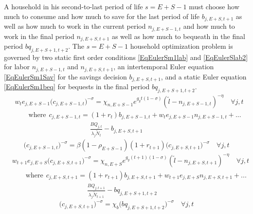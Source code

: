 \documentclass[letterpaper,12pt]{article}
\theoremstyle{definition}
\begin{document}
\begin{spacing}{1.5}
    A household in his second-to-last period of life $s=E+S-1$ must choose how much to consume and how much to save for the last period of life $b_{j,E+S,t+1}$ as well as how much to work in the current period $n_{j,E+S-1,t}$ and how much to work in the final period $n_{j,E+S,t+1}$ as well as how much to bequeath in the final period $bq_{j,E+S+1,t+2}$. The $s=E+S-1$ household optimization problem is governed by two static first order conditions \eqref{EqEulerSm1lab} and \eqref{EqEulerSlab2} for labor  $n_{j,E+S-1,t}$ and $n_{j,E+S,t+1}$, an intertemporal Euler equation \eqref{EqEulerSm1Sav} for the savings decision $b_{j,E+S,t+1}$, and a static Euler equation \eqref{EqEulerSm1beq} for bequests in the final period $bq_{j,E+S+1,t+2}$.
    \begin{equation}\label{EqEulerSm1lab}
      \begin{split}
        &w_t e_{j,E+S-1}\bigl(c_{j,E+S-1,t}\bigr)^{-\sigma} = \chi_{n,E+S-1}e^{g_y t(1-\sigma)}(\tilde{l} - n_{j,E+S-1,t})^{-\eta} \quad\forall j,t \\
        &\quad\quad\text{where}\:\: c_{j,E+S-1,t} = \left(1+r_t\right)b_{j,E+S-1,t} + w_t e_{j,E+S-1}n_{j,E+S-1,t} + ... \\
        &\quad\quad\quad\quad\quad\quad\quad\quad\quad\quad\quad \frac{BQ_{j,t}}{\lambda_j\tilde{N}_t} - b_{j,E+S,t+1}
      \end{split}
    \end{equation}
    \begin{equation}\label{EqEulerSm1Sav}
      \bigl(c_{j,E+S-1,t}\bigr)^{-\sigma} = \beta(1-\rho_{E+S-1})(1+r_{t+1})\bigl(c_{j,E+S,t+1}\bigr)^{-\sigma} \quad\forall j,t
    \end{equation}
    \begin{equation}\label{EqEulerSlab2}
      \begin{split}
        &w_{t+1}e_{j,E+S}\bigl(c_{j,E+S,t+1}\bigr)^{-\sigma} = \chi_{n,E+S}e^{g_y(t+1)(1-\sigma)}(\tilde{l} - n_{j,E+S,t+1})^{-\eta} \quad\forall j,t \\
        &\quad\quad\text{where}\:\: c_{j,E+S,t+1} = \left(1+r_{t+1}\right)b_{j,E+S,t+1} + w_{t+1} e_{j,E+S}n_{j,E+S,t+1} + ... \\
        &\quad\quad\quad\quad\quad\quad\quad\quad\quad\quad\quad \frac{BQ_{j,t+1}}{\lambda_j\tilde{N}_{t+1}} - bq_{j,E+S+1,t+2}
      \end{split}
    \end{equation}
    \begin{equation}\label{EqEulerSm1beq}
      \bigl(c_{j,E+S,t+1}\bigr)^{-\sigma} = \chi_b\bigl(bq_{j,E+S+1,t+2}\bigr)^{-\sigma} \quad\forall j,t
    \end{equation}


\end{spacing}
\end{document}
